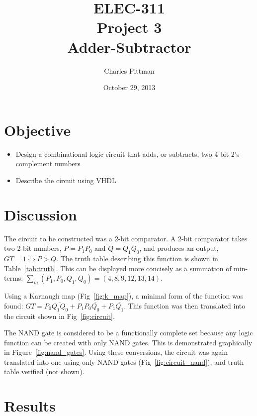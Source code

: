 \documentclass{article}
\author{Charles Pittman}
\title{ELEC-311\\ Project 3\\ Adder-Subtractor}
\date{October 29, 2013}
\begin{document}
\maketitle %

\pagebreak


\section{Objective}
\label{sec:objective}

\begin{itemize}
\item Design a combinational logic circuit that adds, or subtracts, two 4-bit 2's complement numbers
\item Describe the circuit using VHDL
\end{itemize}

\section{Discussion}
\label{sec:procedure}

The circuit to be constructed was a 2-bit comparator.  A 2-bit comparator takes two 2-bit numbers, $P = P_1P_0$ and $Q = Q_1Q_0$, and produces an output, $GT=1 \iff P>Q$.  The truth table describing this function is shown in Table~\ref{tab:truth}.  This can be displayed more concisely as a summation of min-terms: $\sum_m(P_1, P_0, Q_1, Q_0) = (4, 8, 9, 12, 13,14)$.

Using a Karnaugh map (Fig~\ref{fig:k_map}), a minimal form of the
function was found: $GT = P_0 \overline{Q_1 Q_0} + P_1 P_0
\overline{Q_0} + P_1 \overline{Q_1}$.  This function was then
translated into the circuit shown in Fig~\ref{fig:circuit}.

The NAND gate is considered to be a functionally complete set because any logic function can be created with only NAND gates.  This is demonstrated graphically in Figure~\ref{fig:nand_gates}.  Using these conversions, the circuit was again translated into one using only NAND gates (Fig~\ref{fig:circuit_nand}), and truth table verified (not shown).

\section{Results}
\label{sec:results}
\end{document}

